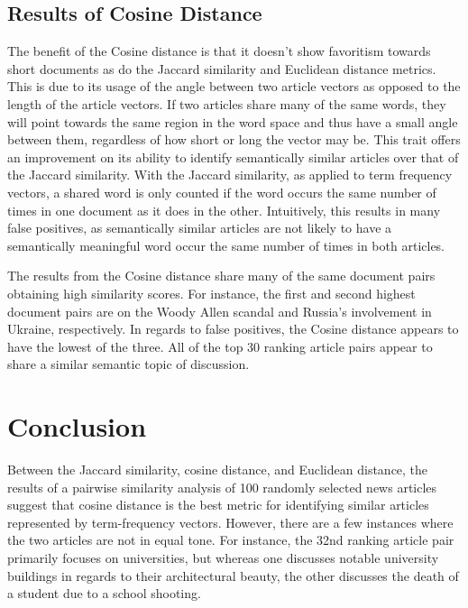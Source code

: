 \documentclass[11pt]{article}
\begin{document}
\subsection{Results of Cosine Distance}
The benefit of the Cosine distance is that it doesn't show favoritism towards short documents as do the Jaccard similarity and Euclidean distance metrics.
This is due to its usage of the angle between two article vectors as opposed to the length of the article vectors.
If two articles share many of the same words, they will point towards the same region in the word space and thus have a small angle between them, regardless of how short or long the vector may be.
This trait offers an improvement on its ability to identify semantically similar articles over that of the Jaccard similarity.
With the Jaccard similarity, as applied to term frequency vectors, a shared word is only counted if the word occurs the same number of times in one document as it does in the other.
Intuitively, this results in many false positives, as semantically similar articles are not likely to have a semantically meaningful word occur the same number of times in both articles.

The results from the Cosine distance share many of the same document pairs obtaining high similarity scores. For instance, the first and second highest document pairs are on the Woody Allen scandal and Russia's involvement in Ukraine, respectively.
In regards to false positives, the Cosine distance appears to have the lowest of the three.
All of the top 30 ranking article pairs appear to share a similar semantic topic of discussion.

\section{Conclusion}

Between the Jaccard similarity, cosine distance, and Euclidean distance, the results of a pairwise similarity analysis of 100 randomly selected news articles suggest that cosine distance is the best metric for identifying similar articles represented by term-frequency vectors.
However, there are a few instances where the two articles are not in equal tone. For instance, the 32nd ranking article pair primarily focuses on universities, but whereas one discusses notable university buildings in regards to their architectural beauty, the other discusses the death of a student due to a school shooting.

{}

\end{document}
